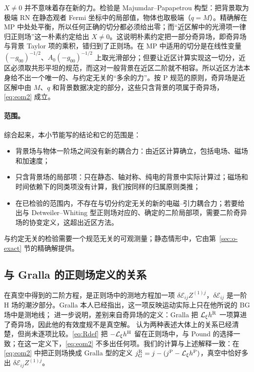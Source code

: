 \documentclass[11pt,a4paper]{ctexart}
\begin{document}
$X\neq0$ 并不意味着存在新的力。检验是 Majumdar--Papapetrou 构型：把背景取为极端 RN 在静态观者 Fermi 坐标中的局部值，物体也取极端（$q=M$）。精确解在 MP 中处处平衡，所以任何正确的切分都必须给出零；而“近区解中的光滑项一律归正则场”这一朴素约定给出 $X\neq0$。这说明朴素约定把一部分奇异场，即奇异场与背景 Taylor 项的乘积，错归到了正则场。在 MP 中适用的切分是在线性变量 $(-g_{00})^{-1/2}$、$A_0(-g_{00})^{-1/2}$ 上取光滑部分；但要让近区计算实现这一切分，近区必须取共形平坦的规范，而这对一般背景在近区二阶就不相容。所以近区方法本身给不出一个唯一的、与约定无关的“多余的力”。按 P 规范的原则，奇异场是近区解中由 $M$、$q$ 和背景数据决定的部分，这些只含背景的项属于奇异场，\eqref{eq:eom2} 成立。

\paragraph{范围。}综合起来，本小节能写的结论和它的范围是：
\begin{itemize}[nosep]
\item 背景场与物体一阶场之间没有新的耦合力：由近区计算确立，包括电场、磁场和加速度；
\item 只含背景场的局部项：只在静态、轴对称、纯电的背景中实际计算过；磁场和时间依赖下的同类项没有计算，我们按同样的归属原则类推；
\item 在已检验的范围内，不存在与切分约定无关的新的电磁--引力耦合力；若要给出与 Detweiler--Whiting 型正则场对应的、确定的二阶局部项，需要二阶奇异场的协变定义，这超出近区方法。
\end{itemize}
与约定无关的检验需要一个规范无关的可观测量；静态情形中，它由第~\ref{sec:o-exact} 节的精确解提供。

\subsection{与 Gralla 的正则场定义的关系}\label{sec:second-Gralla}

\citet{Gralla2012} 在真空中得到的二阶方程，是正则场中的测地方程加一项 $\delta\mathcal E_{ij}Z^{(1)j}$，$\delta\mathcal E_{ij}$ 是一阶 H 场的潮汐部分。Gralla 本人已经指出，这一项反映运动实际上只在他所说的 BG 场中是测地线；\citet{Pound2017} 进一步说明，差别来自奇异场的定义：Gralla 把 $\mathcal L_\xi h^{\rm R}$ 一项算进了奇异场，因此他的有效度规不是真空解。\citet{BarackPound2019} 认为两种表述大体上的关系已经清楚，但尚未逐项比较。\eqref{eq:Rdef} 把 $-\mathcal L_\xi h^{\rm H}$ 留在正则场中，与 Pound 的选择一致；在这一定义下，\eqref{eq:eom2} 不多出任何项。我们的计算与上述解释一致：在 \eqref{eq:eom2} 中把正则场换成 Gralla 型的定义 $j^{\rm R}_{\rm G}=j-(j^{\rm P}-\mathcal L_\xi h^{\rm P})$，真空中恰好多出 $\delta\mathcal E_{ij}Z^{(1)j}$。
\end{document}
